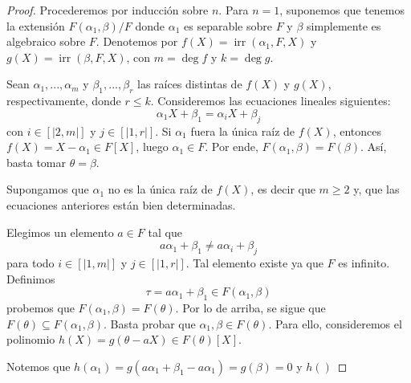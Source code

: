\documentclass[12pt]{report}
\theoremstyle{largebreak}
\newcommand\natint[1]{\ensuremath{\left[\big|#1\big|\right]}}
\DeclareMathOperator{\irr}{irr}
\begin{document}
    \begin{proof}
        Procederemos por inducción sobre $n$. Para $n=1$, suponemos que tenemos la extensión $F(\alpha_1,\beta)/F$ donde $\alpha_1$ es separable sobre $F$ y $\beta$ simplemente es algebraico sobre $F$. Denotemos por $f(X)=\irr\left(\alpha_1,F,X \right)$ y $g(X)=\irr\left(\beta,F,X \right)$, con $m=\deg f$ y $k=\deg g$.

        Sean $\alpha_1,...,\alpha_m$ y $\beta_1,...,\beta_r$ las raíces distintas de $f(X)$ y $g(X)$, respectivamente, donde $r\leq k$.
        Consideremos las ecuaciones lineales siguientes:
        \begin{equation*}
            \alpha_1X+\beta_1=\alpha_iX+\beta_j
        \end{equation*}
        con $i\in\natint{2,m}$ y $j\in\natint{1,r}$. Si $\alpha_1$ fuera la única raíz de $f(X)$, entonces $f(X)=X-\alpha_1\in F[X]$, luego $\alpha_1\in F$. Por ende, $F(\alpha_1,\beta)=F(\beta)$. Así, basta tomar $\theta=\beta$.

        Supongamos que $\alpha_1$ no es la única raíz de $f(X)$, es decir que $m\geq 2$ y, que las ecuaciones anteriores están bien determinadas.

        Elegimos un elemento $a\in F$ tal que
        \begin{equation*}
            a\alpha_1+\beta_1\neq a\alpha_i+\beta_j
        \end{equation*}
        para todo $i\in\natint{1,m}$ y $j\in\natint{1,r}$. Tal elemento existe ya que $F$ es infinito. Definimos
        \begin{equation*}
            \tau=a\alpha_1+\beta_1\in F(\alpha_1,\beta)
        \end{equation*}
        probemos que $F(\alpha_1,\beta)=F(\theta)$. Por lo de arriba, se sigue que $F(\theta)\subseteq F(\alpha_1,\beta)$. Basta probar que $\alpha_1,\beta\in F(\theta)$. Para ello, consideremos el polinomio $h(X)=g(\theta-aX)\in F(\theta)[X]$.

        Notemos que $h(\alpha_1)=g(a\alpha_1+\beta_1-a\alpha_1)=g(\beta)=0$ y $h()$
    \end{proof}
\end{document}

